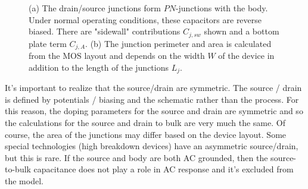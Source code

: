 \begin{figure}[tb]
\centering
{}
\caption{(a) The drain/source junctions form $PN$-junctions with the body.  Under normal operating conditions, these capacitors are reverse biased.  There are "sidewall" contributions $C_{j,sw}$ shown and a bottom plate term $C_{j,A}$.  (b)  The junction perimeter and area is calculated from the MOS layout and depends on the width $W$ of the device in addition to the length of the junctions $L_j$.} 
\end{figure}
It's important to realize that the source/drain are symmetric.  The source / drain is defined by potentials / biasing and the schematic rather than the process. For this reason, the doping parameters for the source and drain are symmetric and so the calculations for the source and drain to bulk are very much the same.  Of course, the area of the junctions may differ based on the device layout.	Some special technologies (high breakdown devices) have an asymmetric source/drain, but this is rare.	 If the source and body are both AC grounded, then the source-to-bulk capacitance does not play a role in AC response and it's excluded from the model.
